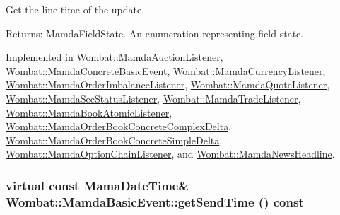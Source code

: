 Get the line time of the update. 

\begin{Desc}
\item[Returns:]Mamda\-Field\-State. An enumeration representing field state. \end{Desc}


Implemented in \hyperlink{classWombat_1_1MamdaAuctionListener_c73a0f3c19ad3a9106925e6fa89599ef}{Wombat::Mamda\-Auction\-Listener}, \hyperlink{classWombat_1_1MamdaConcreteBasicEvent_8f501fe426d7cff7486834d8fbafa2d6}{Wombat::Mamda\-Concrete\-Basic\-Event}, \hyperlink{classWombat_1_1MamdaCurrencyListener_a1c7db47ff4db093c4d13fddc44fd7e6}{Wombat::Mamda\-Currency\-Listener}, \hyperlink{classWombat_1_1MamdaOrderImbalanceListener_e5911efbbda1cb87fb25f7869a01a103}{Wombat::Mamda\-Order\-Imbalance\-Listener}, \hyperlink{classWombat_1_1MamdaQuoteListener_35e889726482c3d6865c20adfd311e0b}{Wombat::Mamda\-Quote\-Listener}, \hyperlink{classWombat_1_1MamdaSecStatusListener_3772a00bb836461eb5dac1a57631b000}{Wombat::Mamda\-Sec\-Status\-Listener}, \hyperlink{classWombat_1_1MamdaTradeListener_dca5ca34bb9de2bdd8579a618dda72dd}{Wombat::Mamda\-Trade\-Listener}, \hyperlink{classWombat_1_1MamdaBookAtomicListener_74f25a0ce9a9b71b44d482017457e260}{Wombat::Mamda\-Book\-Atomic\-Listener}, \hyperlink{classWombat_1_1MamdaOrderBookConcreteComplexDelta_9ef0367548a6c0f08db939e578cdf8b9}{Wombat::Mamda\-Order\-Book\-Concrete\-Complex\-Delta}, \hyperlink{classWombat_1_1MamdaOrderBookConcreteSimpleDelta_bee5379fb48632af52473efa00f8e92b}{Wombat::Mamda\-Order\-Book\-Concrete\-Simple\-Delta}, \hyperlink{classWombat_1_1MamdaOptionChainListener_659564bc5b35a81418fa01d1c4982ad5}{Wombat::Mamda\-Option\-Chain\-Listener}, and \hyperlink{classWombat_1_1MamdaNewsHeadline_c89f8f0d4d435a3c4b168a54d6b550be}{Wombat::Mamda\-News\-Headline}.\hypertarget{classWombat_1_1MamdaBasicEvent_b0602a83bec20cd8b341ec866ff3bffa}{
\subsubsection[getSendTime]{\setlength{\rightskip}{0pt plus 5cm}virtual const Mama\-Date\-Time\& Wombat::Mamda\-Basic\-Event::get\-Send\-Time () const}}
\label{classWombat_1_1MamdaBasicEvent_b0602a83bec20cd8b341ec866ff3bffa}


